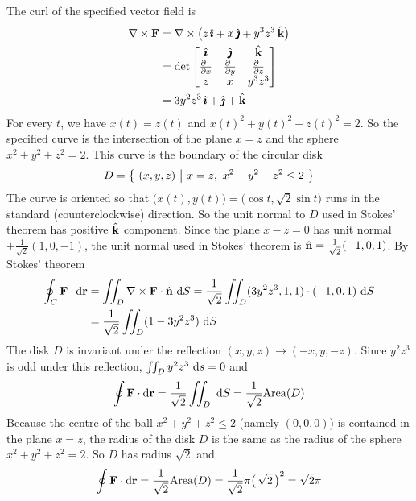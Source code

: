 \begin{solution} 
The curl of the specified vector field is
\begin{align*}
\nabla\times\vF
&=\nabla\times\big(z\,\hi+x\,\hj+y^3z^3\,\hk\big) \\
&= \det\left[\begin{matrix}
\hi & \hj & \hk \\
\tfrac{\partial\hfill}{\partial x} & \tfrac{\partial\hfill}{\partial y} & 
                \tfrac{\partial\hfill}{\partial z} \\
z & x & y^3z^3
\end{matrix}\right] \\
&=3y^2z^3\,\hi+\hj+\hk
\end{align*}
For every $t$, we have $x(t)=z(t)$ and $x(t)^2+y(t)^2+z(t)^2=2$.
So the specified curve is the intersection of the plane $x=z$ and the sphere
$x^2+y^2+z^2=2$. This curve is the boundary of the circular disk 
\begin{equation*}
D = \big\{ \ (x,y,z)\ \big|\ x=z,\ x^2+y^2+z^2\le 2\ \big\}
\end{equation*}
The curve is oriented so that 
$\big(x(t),y(t)\big)=\big(\cos t,\sqrt{2}\sin t\big)$
runs in the standard (counterclockwise) direction. So the unit normal
to $D$ used in Stokes' theorem has positive $\hat{\mathbf{k}}$ component. Since the
plane $x-z=0$ has unit normal $\pm\frac{1}{\sqrt{2}}(1,0,-1)$, the unit
normal used in Stokes' theorem is $\hat{\mathbf{n}}=\frac{1}{\sqrt{2}}(-1,0,1)$. By Stokes'
theorem
\begin{align*}
\oint_C \mathbf{F}\cdot \mathrm{d}\mathbf{r}
&=\iint_D\nabla\times\mathbf{F}\cdot\hat{\mathbf{n}}\ \mathrm{d}S
=\frac{1}{\sqrt{2}}\iint_D(3y^2z^3,1,1)\cdot(-1,0,1)\ \mathrm{d}S \\
&=\frac{1}{\sqrt{2}}\iint_D(1-3y^2z^3)\ \mathrm{d}S
\end{align*}
The disk $D$ is invariant under the reflection $(x,y,z)\rightarrow(-x,y,-z)$.
Since $y^2z^3$ is odd under this reflection, $\iint_D y^2z^3\ \mathrm{d}s=0$
and
\begin{equation*}
\oint \mathbf{F}\cdot \mathrm{d}\mathbf{r}
=\frac{1}{\sqrt{2}}\iint_D \ \mathrm{d}S
=\frac{1}{\sqrt{2}}{\rm Area}(D)
\end{equation*}
Because the centre of the ball $x^2+y^2+z^2\le 2$ (namely $(0,0,0)$)
is contained in the plane $x=z$, the radius of the disk $D$ is the same
as the radius of the sphere $x^2+y^2+z^2=2$. So $D$ has radius $\sqrt{2}$ and
\begin{equation*}
\oint \mathbf{F}\cdot \mathrm{d}\mathbf{r}
=\frac{1}{\sqrt{2}}{\rm Area}(D)
=\frac{1}{\sqrt{2}}\pi{\big(\,\sqrt{2}\,\big)}^2
=\sqrt{2}\pi
\end{equation*}
\end{solution}

